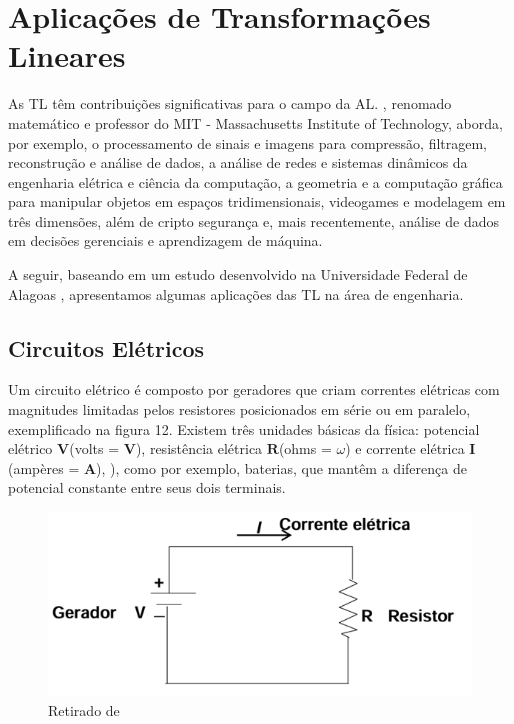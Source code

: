 \chapter{Aplicações de Transformações Lineares}
As TL têm contribuições significativas para o campo da AL. \cite{strang2010}, renomado matemático e professor do MIT - Massachusetts Institute of Technology, aborda, por exemplo, o processamento de sinais e imagens para compressão, filtragem, reconstrução e análise de dados, a análise de redes e sistemas dinâmicos da engenharia elétrica e ciência da computação, a geometria e a computação gráfica para manipular objetos em espaços tridimensionais, videogames e modelagem em três dimensões, além de cripto segurança e, mais recentemente, análise de dados em decisões gerenciais e aprendizagem de máquina. \nocite{pitombeira1971}

A seguir, baseando em um estudo desenvolvido na Universidade Federal de Alagoas \cite{sirlandro2017}, apresentamos algumas aplicações das TL na área de engenharia.

\section{Circuitos Elétricos}
Um circuito elétrico é composto por geradores que criam correntes elétricas com magnitudes limitadas pelos resistores posicionados em série ou em paralelo, exemplificado na figura 12. Existem três unidades básicas da física: potencial elétrico $\mathbf{V}$(volts = $\mathbf{V}$), resistência elétrica $\mathbf{R}$(ohms = $\omega$) e corrente elétrica $\mathbf{I}$(ampères = $\mathbf{A}$), ), como por exemplo, baterias, que mantêm a diferença de potencial constante entre seus dois terminais.

\begin{figure}[H]
	\centering
	\includegraphics[scale=0.90]{a_fg1.png}
	\caption{Retirado de \cite{sirlandro2017}}
\end{figure}

